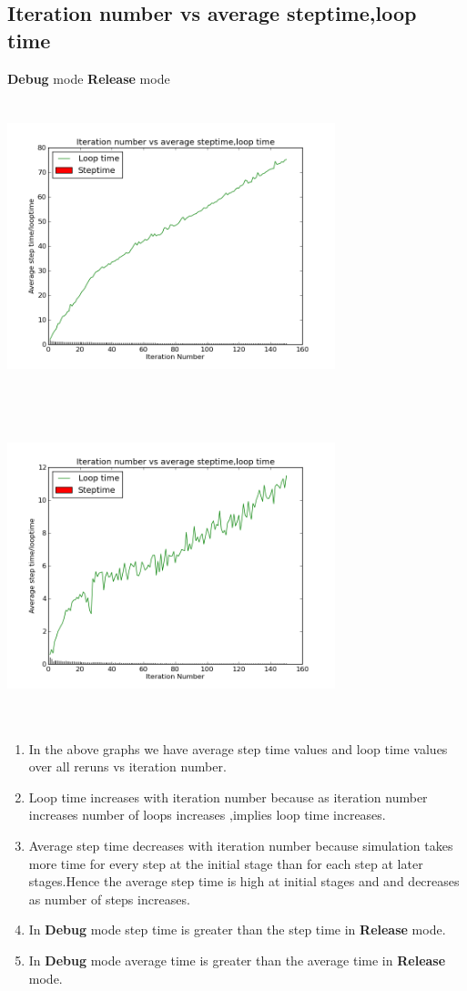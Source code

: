 \documentclass{article}
\begin{document}
\subsection{Iteration number vs average steptime,loop time}
\textbf{Debug} mode \hfill \textbf{Release} mode\\
\includegraphics[width=270pt,height=260pt]{g27_lab09_plot01_debug} \hfill  
\includegraphics[width=270pt,height=260pt]{g27_lab09_plot01_release}\\
\begin{enumerate}
\item In the above graphs we have average step time values and loop time values over 
all reruns vs iteration number.\\
\item Loop time increases with iteration number because as iteration number increases number of loops increases
,implies loop  time increases.
\item Average step time decreases with iteration number because simulation takes more time for every step at the 
initial stage than for each step at later stages.Hence the average step time is high at initial stages and 
and decreases as number of steps increases.
\item In \textbf{Debug} mode step time is greater than the step time in \textbf{Release} mode.
\item In \textbf{Debug} mode average time is greater than the average time in \textbf{Release} mode.
\end{enumerate}
\end{document}
